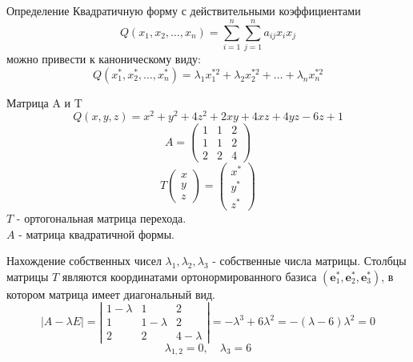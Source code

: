 \subsection{}
\begin{frame}{Определение}
    Квадратичную форму с действительными коэффициентами
    \[
        Q\left(x_{1}, x_{2}, \ldots, x_{n}\right)=\sum_{i=1}^{n} \sum_{j=1}^{n} a_{i j} x_{i} x_{j}
    \]
    можно привести к каноническому виду:
    \[
    Q\left(x_{1}^{*}, x_{2}^{*}, \ldots, x_{n}^{*}\right)=\lambda_{1} x_{1}^{* 2}+\lambda_{2} x_{2}^{* 2}+\ldots+\lambda_{n} x_{n}^{* 2}
    \]
\end{frame}
\begin{frame}{Матрица A и T}
    \[
        Q(x, y, z)=x^{2}+y^{2}+4 z^{2}+2 x y+4 x z+4 y z-6 z+1
    \] 
    \[
        A=\left(\begin{array}{lll}
        1 & 1 & 2 \\
        1 & 1 & 2 \\
        2 & 2 & 4
        \end{array}\right)
    \]
    \[
        T\left(\begin{array}{l}
        x \\
        y \\
        z
        \end{array}\right)=\left(\begin{array}{l}
        x^{*} \\
        y^{*} \\
        z^{*}
        \end{array}\right)
        \]
    $T$ - ортогональная матрица перехода. \\
    $A$ - матрица квадратичной формы. 
\end{frame}
\begin{frame}{Нахождение собственных чисел}
    $\lambda_{1}, \lambda_{2}, \lambda_{3}$ - собственные числа матрицы. Столбцы матрицы $T$ являются координатами ортонормированного базиса $\left(\mathbf{e}_{1}^{*}, \mathbf{e}_{2}^{*}, \mathbf{e}_{3}^{*}\right)$, в котором матрица имеет диагональный вид.
    \[
        |A-\lambda E|=\left|\begin{array}{ccc}
        1-\lambda & 1 & 2 \\
        1 & 1-\lambda & 2 \\
        2 & 2 & 4-\lambda
        \end{array}\right|=-\lambda^{3}+6 \lambda^{2}=-(\lambda-6) \lambda^{2}=0
    \]
    \[
        \lambda_{1,2}=0, \quad \lambda_{3}=6
    \]
\end{frame}
